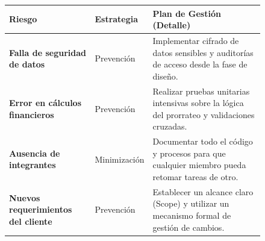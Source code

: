 \begin{figure}[H]
    \centering
    \begin{tabularx}{\textwidth}{|p{5.5cm}|p{2.5cm}|X|}
    \hline
        \textbf{Riesgo} 
        
        & 
        
            \textbf{Estrategia} 
        
        & 
        
            \textbf{Plan de Gestión (Detalle)} 
        
    \\ \hline
    
            \textbf{Falla de seguridad de datos} 
        
        & 
        
            Prevención 
        
        & 
        
            Implementar cifrado de datos sensibles y auditorías de acceso desde la fase de diseño. 
        
    \\ \hline
    
            \textbf{Error en cálculos financieros} 
        
        & 
        
            Prevención 
        
        & 
        
            Realizar pruebas unitarias intensivas sobre la lógica del prorrateo y validaciones cruzadas. 
        
    \\ \hline
    
            \textbf{Ausencia de integrantes} 
        
        & 
        
            Minimización 
        
        & 
        
            Documentar todo el código y procesos para que cualquier miembro pueda retomar tareas de otro. 
        
    \\ \hline
    
            \textbf{Nuevos requerimientos del cliente} 
        
        & 
        
            Prevención 
        
        & 
        
            Establecer un alcance claro (Scope) y utilizar un mecanismo formal de gestión de cambios. 
        

\end{tabularx}
\end{figure}
